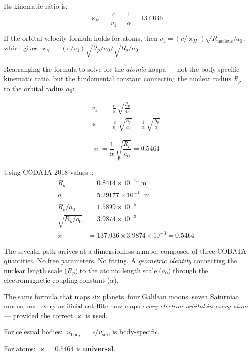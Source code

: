 \documentclass[twocolumn,epjc3]{svjour3}
\newcommand{\kop}{\varkappa}  %
\begin{document}
Its kinematic ratio is:
\begin{equation}
  \kop_H = \frac{c}{v_1} = \frac{1}{\alpha} = 137.036
\end{equation}

If the orbital velocity formula holds for atoms, then $v_1 = (c/\kop_H)\sqrt{R_{\text{nucleus}}/a_0}$, which gives $\kop_H = (c/v_1)\sqrt{R_p/a_0}/\sqrt{R_p/a_0}$.

Rearranging the formula to solve for the \emph{atomic} koppa --- not the body-specific kinematic ratio, but the fundamental constant connecting the nuclear radius $R_p$ to the orbital radius $a_0$:

\begin{align}
  v_1 &= \frac{c}{\kop}\,\sqrt{\frac{R_p}{a_0}} \\[4pt]
  \kop &= \frac{c}{v_1}\,\sqrt{\frac{R_p}{a_0}} = \frac{1}{\alpha}\,\sqrt{\frac{R_p}{a_0}}
\end{align}

\begin{equation}\label{eq:koppa-derived}
  \boxed{\kop = \frac{1}{\alpha}\,\sqrt{\frac{R_p}{a_0}} = 0.5464}
\end{equation}

Using CODATA 2018 values~\cite{codata2018}:
\begin{align}
  R_p &= 0.8414 \times 10^{-15}\;\text{m} \\
  a_0 &= 5.29177 \times 10^{-11}\;\text{m} \\
  R_p/a_0 &= 1.5899 \times 10^{-5} \\
  \sqrt{R_p/a_0} &= 3.9874 \times 10^{-3} \\
  \kop &= 137.036 \times 3.9874 \times 10^{-3} = \mathbf{0.5464}
\end{align}

The seventh path arrives at a dimensionless number composed of three CODATA quantities.  No free parameters.  No fitting.  A \emph{geometric identity} connecting the nuclear length scale ($R_p$) to the atomic length scale ($a_0$) through the electromagnetic coupling constant ($\alpha$).

The same formula that maps six planets, four Galilean moons, seven Saturnian moons, and every artificial satellite now maps \emph{every electron orbital in every atom} --- provided the correct $\kop$ is used.

For celestial bodies: $\kop_{\text{body}} = c/v_{\text{surf}}$ is body-specific.

For atoms: $\kop = 0.5464$ is \textbf{universal}.
\end{document}
